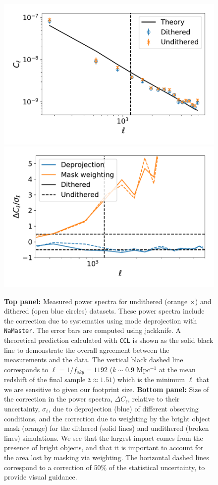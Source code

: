 \documentclass[\docopts]{\docclass}
\begin{document}
\begin{figure}
\centering
\includegraphics[width=0.9\columnwidth]{Cl_results_2019_comp}
\includegraphics[width=0.9\columnwidth]{systematics_comp_abs}
\caption{{\bf Top panel:} Measured power spectra for undithered (orange $\times$) and dithered (open blue circles) datasets. These power spectra include the correction due to systematics using mode deprojection with \texttt{NaMaster}. The error bars are computed using jackknife. A theoretical prediction calculated with \texttt{CCL} is shown as the solid black line to demonstrate the overall agreement between the measurements and the data. The vertical black dashed line corresponds to $\ell = 1/f_{sky}=1192$ ($k \sim 0.9$ Mpc$^{-1}$ at the mean redshift of the final sample $\bar{z} \approx 1.51$) which is the minimum $\ell$ that we are sensitive to given our footprint size. {\bf Bottom panel:} Size of the correction in the power spectra, $\Delta C_{\ell}$, relative to their uncertainty, $\sigma_{\ell}$, due to deprojection (blue) of different observing conditions, and the correction due to weighting by the bright object mask (orange) for the dithered (solid lines) and undithered (broken lines) simulations. We see that the largest impact comes from the presence of bright objects, and that it is important to account for the area lost by masking via weighting. The horizontal dashed lines correspond to a correction of 50\% of the statistical uncertainty, to provide visual guidance.} 
\label{fig:power_spectra}
\end{figure}
\end{document}
